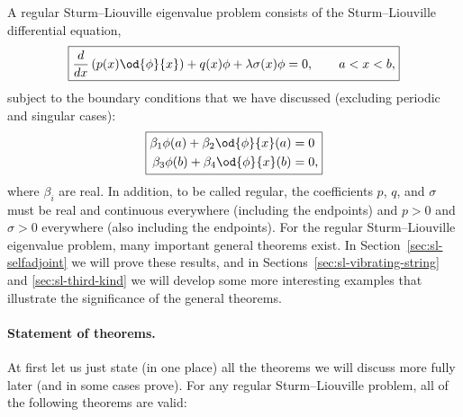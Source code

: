 A regular Sturm--Liouville eigenvalue problem consists of the Sturm--Liouville differential equation,
\begin{equation}
\label{eq:sl-regular}
\boxed{\frac{d}{d x}\left(p(x)\od{\phi}{x}\right) + q(x)\phi + \lambda\sigma(x)\phi = 0, \qquad a < x < b,}
\end{equation}
subject to the boundary conditions that we have discussed (excluding periodic and singular cases):
\begin{equation}
\label{eq:sl-bc}
\boxed{\begin{aligned}
\beta_1\phi(a) + \beta_2\od{\phi}{x}(a) &= 0 \\
\beta_3\phi(b) + \beta_4\od{\phi}{x}(b) &= 0,
\end{aligned}}
\end{equation}
where $\beta_i$ are real.  In addition, to be called regular, the coefficients $p$, $q$, and $\sigma$ must be real and continuous everywhere (including the endpoints) and $p > 0$ and $\sigma > 0$ everywhere (also including the endpoints).  For the regular Sturm--Liouville eigenvalue problem, many important general theorems exist.  In Section~\ref{sec:sl-selfadjoint} we will prove these results, and in Sections~\ref{sec:sl-vibrating-string} and \ref{sec:sl-third-kind} we will develop some more interesting examples that illustrate the significance of the general theorems.

\paragraph{Statement of theorems.}
At first let us just state (in one place) all the theorems we will discuss more fully later (and in some cases prove).  For any regular Sturm--Liouville problem, all of the following theorems are valid:


